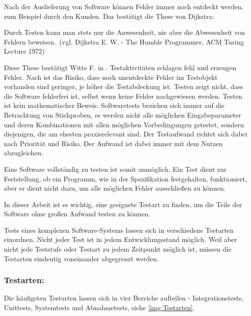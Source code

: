 \documentclass[a4paper,titlepage,halfparskip,12pt]{scrreprt}
\begin{document}
\begin{onehalfspacing}
Nach der Auslieferung von Software können Fehler immer noch entdeckt werden, zum Beispiel durch den Kunden. Das bestätigt die These von Dijkstra:

\smallskip

\glqq Durch Testen kann man stets nur die Anwesenheit, nie aber die Abwesenheit von Fehlern beweisen.\grqq\ (vgl. Dijkstra E. W. - The Humble Programmer, ACM Turing Lecture 1972)

\smallskip

Diese These bestätigt Witte F. in \cite{witte2019testmanagement}. Testaktivitäten schlagen fehl und erzeugen Fehler. Nach \cite{witte2019testmanagement} ist das Risiko, dass noch unentdeckte Fehler im Testobjekt vorhanden sind geringer, je höher die Testabdeckung ist. Testen zeigt nicht, dass die Software fehlerfrei ist, selbst wenn keine Fehler nachgewiesen werden. Testen ist kein mathematischer Beweis. Softwaretests beziehen sich immer auf die Betrachtung von Stichproben, es werden nicht alle möglichen Eingabeparameter und deren Kombinationen mit allen möglichen Vorbedingungen getestet, sondern diejenigen, die am ehesten praxisrelevant sind. Der Testaufwand richtet sich dabei nach Priorität und Risiko. Der Aufwand ist dabei immer mit
dem Nutzen abzugleichen.

Eine Software vollständig zu testen ist somit unmöglich. Ein Test dient zur Feststellung, ob ein Programm, wie in der Spezifikation festgehalten,
funktioniert, aber er dient nicht dazu, um alle möglichen Fehler ausschließen zu können.

In dieser Arbeit ist es wichtig, eine geeignete Testart zu finden, um die Teile der Software ohne großen Aufwand testen zu können.

Tests eines komplexen Software-Systems lassen sich in verschiedene Testarten einordnen. Nicht jeder Test ist in jedem Entwicklungsstand möglich. Weil aber nicht jede Teststufe oder Testart zu jedem Zeitpunkt möglich ist, müssen die Testarten eindeutig voneinander abgegrenzt werden.

\subsubsection*{Testarten:}

Die häufigsten Testarten lassen sich in vier Bereiche aufteilen - Integrationstests, Unittests, Systemtests und Abnahmetests, siehe \autoref{img:Testarten}.


\end{onehalfspacing}
\end{document}
